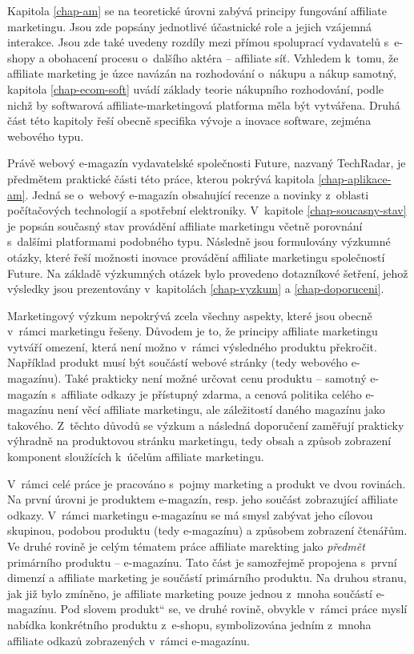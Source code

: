 \documentclass[12pt,twoside,openany]{fithesis}
\begin{document}
Kapitola \hyperlink{chap-am}{{\ref{chap-am}}} se na teoretické úrovni 
zabývá principy fungování affiliate marketingu. Jsou zde popsány 
jednotlivé účastnické role a jejich vzájemná interakce. Jsou zde také 
uvedeny rozdíly mezi přímou spoluprací vydavatelů s~e-shopy a obohacení 
procesu o~dalšího aktéra -- affiliate síť. Vzhledem k~tomu, že affiliate 
marketing je úzce navázán na rozhodování o~nákupu a nákup samotný, 
kapitola \hyperlink{chap-ecom-soft}{{\ref{chap-ecom-soft}}} uvádí základy 
teorie nákupního rozhodování, podle nichž by softwarová 
affiliate-marketingová platforma měla být vytvářena. Druhá část této 
kapitoly řeší obecně specifika vývoje a inovace software, zejména 
webového typu.

Právě webový e-magazín vydavatelské společnosti Future, nazvaný 
TechRadar, je předmětem praktické části této práce, kterou pokrývá 
kapitola \hyperlink{chap-aplikace-am}{{\ref{chap-aplikace-am}}}. Jedná se 
o~webový e-magazín obsahující recenze a novinky z~oblasti počítačových 
technologií a spotřební elektroniky. V~kapitole 
\hyperlink{chap-soucasny-stav}{{\ref{chap-soucasny-stav}}} je popsán 
současný stav provádění affiliate marketingu včetně porovnání 
s~dalšími platformami podobného typu. Následně jsou formulovány 
výzkumné otázky, které řeší možnosti inovace provádění affiliate 
marketingu společností Future. Na základě výzkumných otázek bylo 
provedeno dotazníkové šetření, jehož výsledky jsou prezentovány 
v~kapitolách \hyperlink{chap-vyzkum}{{\ref{chap-vyzkum}}} a 
\hyperlink{chap-doporuceni}{{\ref{chap-doporuceni}}}.

Marketingový výzkum nepokrývá zcela všechny aspekty, které jsou obecně 
v~rámci marketingu řešeny. Důvodem je to, že principy affiliate marketingu 
vytváří omezení, která není možno v~rámci výsledného produktu 
překročit. Například produkt musí být součástí webové stránky (tedy 
webového e-magazínu). Také prakticky není možné určovat cenu produktu -- 
samotný e-magazín s~affiliate odkazy je přístupný zdarma, a cenová 
politika celého e-magazínu není věcí affiliate marketingu, ale 
záležitostí daného magazínu jako takového. Z~těchto důvodů se výzkum 
a následná doporučení zaměřují prakticky výhradně na produktovou 
stránku marketingu, tedy obsah a způsob zobrazení komponent sloužících 
k~účelům affiliate marketingu.

V~rámci celé práce je pracováno s~pojmy marketing a produkt ve dvou 
rovinách. Na první úrovni je produktem e-magazín, resp. jeho součást 
zobrazující affiliate odkazy. V~rámci marketingu e-magazínu se má smysl 
zabývat jeho cílovou skupinou, podobou produktu (tedy e-magazínu) a 
způsobem zobrazení čtenářům. Ve druhé rovině je celým tématem práce 
affiliate marekting jako {\em{předmět}} primárního produktu -- e-magazínu. 
Tato část je samozřejmě propojena s~první dimenzí a affiliate marketing 
je součástí primárního produktu. Na druhou stranu, jak již bylo 
zmíněno, je affiliate marketing pouze jednou z~mnoha součástí e-magazínu. 
Pod slovem \glqq produkt\textquotedblleft{} se, ve druhé rovině, obvykle 
v~rámci práce myslí nabídka konkrétního produktu z~e-shopu, 
symbolizována jedním z~mnoha affiliate odkazů zobrazených v~rámci 
e-magazínu.
\end{document}
